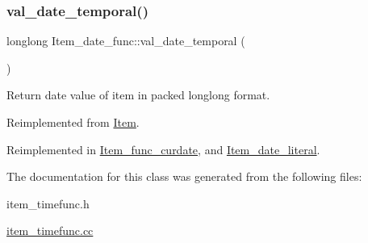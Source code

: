 \mbox{\label{classItem__date__func_a34f95de47fe9ff5bfe16fb641ec22a42}} 
\subsubsection{\texorpdfstring{val\+\_\+date\+\_\+temporal()}{val\_date\_temporal()}}
{\footnotesize\ttfamily longlong Item\+\_\+date\+\_\+func\+::val\+\_\+date\+\_\+temporal (\begin{DoxyParamCaption}{ }\end{DoxyParamCaption})\hspace{0.3cm}{\ttfamily [virtual]}}

Return date value of item in packed longlong format. 

Reimplemented from \mbox{\hyperlink{classItem_a9174217a46706eb2db74689b5365c4a5}{Item}}.



Reimplemented in \mbox{\hyperlink{classItem__func__curdate_aa8961163e017b6d68c26df334cd9c0b6}{Item\+\_\+func\+\_\+curdate}}, and \mbox{\hyperlink{classItem__date__literal_a03ebcf3ba975b9b8605edad6e902b2db}{Item\+\_\+date\+\_\+literal}}.



The documentation for this class was generated from the following files\+:\begin{DoxyCompactItemize}
\item 
item\+\_\+timefunc.\+h\item 
\mbox{\hyperlink{item__timefunc_8cc}{item\+\_\+timefunc.\+cc}}\end{DoxyCompactItemize}
